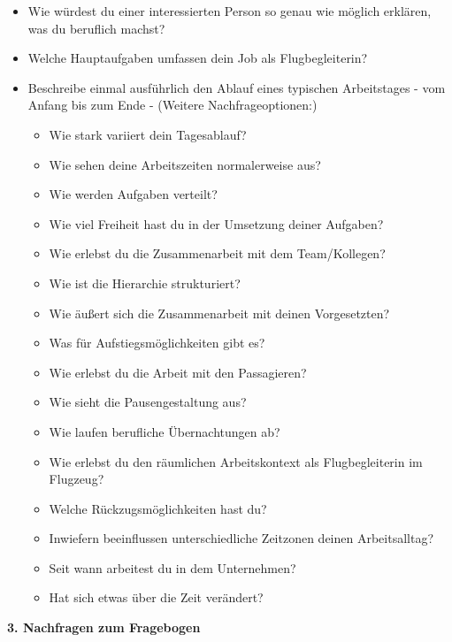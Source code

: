\documentclass[12pt, a4paper]{article}
\begin{document}
\begin{tcolorbox}[
  breakable,
  colback=gray!10,
  colframe=black,
  arc=10pt,          %
  boxrule=0.5pt,
  left=6pt, right=6pt, top=6pt, bottom=6pt
]
\begin{itemize}
    \item Wie würdest du einer interessierten Person so genau wie möglich erklären, was du
    beruflich machst?
    \item Welche Hauptaufgaben umfassen dein Job als Flugbegleiterin?
    \item Beschreibe einmal ausführlich den Ablauf eines typischen Arbeitstages - vom Anfang
    bis zum Ende - (Weitere Nachfrageoptionen:)
    \begin{itemize}
        \item Wie stark variiert dein Tagesablauf?
        \item Wie sehen deine Arbeitszeiten normalerweise aus?
        \item Wie werden Aufgaben verteilt?
        \item Wie viel Freiheit hast du in der Umsetzung deiner Aufgaben?
        \item Wie erlebst du die Zusammenarbeit mit dem Team/Kollegen?
        \item Wie ist die Hierarchie strukturiert?
        \item Wie äußert sich die Zusammenarbeit mit deinen Vorgesetzten?
        \item Was für Aufstiegsmöglichkeiten gibt es?
        \item Wie erlebst du die Arbeit mit den Passagieren?
        \item Wie sieht die Pausengestaltung aus?
        \item Wie laufen berufliche Übernachtungen ab?
        \item Wie erlebst du den räumlichen Arbeitskontext als Flugbegleiterin im
        Flugzeug?
        \item Welche Rückzugsmöglichkeiten hast du?
        \item Inwiefern beeinflussen unterschiedliche Zeitzonen deinen Arbeitsalltag?
        \item Seit wann arbeitest du in dem Unternehmen?
        \item Hat sich etwas über die Zeit verändert?
    \end{itemize}
\end{itemize}

\textbf{3. Nachfragen zum Fragebogen} \\


\end{tcolorbox}
\end{document}
